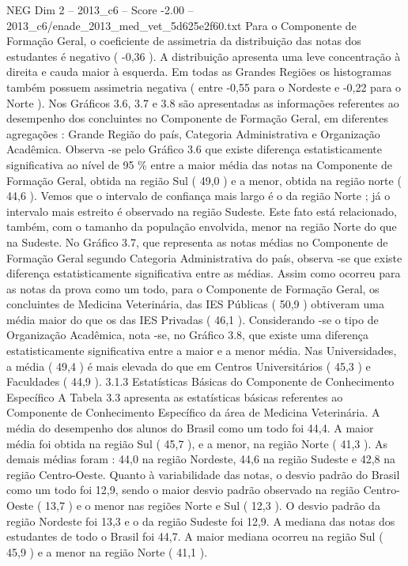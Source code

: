 \begin{textsample}{NEG Dim 2 – 2013\_c6 – Score -2.00 – 2013\_c6/enade\_2013\_med\_vet\_5d625e2f60.txt}
Para o Componente de Formação Geral, o coeficiente de assimetria da distribuição das notas dos estudantes é negativo ( -0,36 ).
A distribuição apresenta uma leve concentração à direita e cauda maior à esquerda.
Em todas as Grandes Regiões os histogramas também possuem assimetria negativa ( entre -0,55 para o Nordeste e -0,22 para o Norte ).
Nos Gráficos 3.6, 3.7 e 3.8 são apresentadas as informações referentes ao desempenho dos concluintes no Componente de Formação Geral, em diferentes agregações : Grande Região do país, Categoria Administrativa e Organização Acadêmica.
Observa -se pelo Gráfico 3.6 que existe diferença estatisticamente significativa ao nível de 95 \% entre a maior média das notas na Componente de Formação Geral, obtida na região Sul ( 49,0 ) e a menor, obtida na região norte ( 44,6 ).
Vemos que o intervalo de confiança mais largo é o da região Norte ; já o intervalo mais estreito é observado na região Sudeste.
Este fato está relacionado, também, com o tamanho da população envolvida, menor na região Norte do que na Sudeste.
No Gráfico 3.7, que representa as notas médias no Componente de Formação Geral segundo Categoria Administrativa do país, observa -se que existe diferença estatisticamente significativa entre as médias.
Assim como ocorreu para as notas da prova como um todo, para o Componente de Formação Geral, os concluintes de Medicina Veterinária, das IES Públicas ( 50,9 ) obtiveram uma média maior do que os das IES Privadas ( 46,1 ).
Considerando -se o tipo de Organização Acadêmica, nota -se, no Gráfico 3.8, que existe uma diferença estatisticamente significativa entre a maior e a menor média.
Nas Universidades, a média ( 49,4 ) é mais elevada do que em Centros Universitários ( 45,3 ) e Faculdades ( 44,9 ). 3.1.3 Estatísticas Básicas do Componente de Conhecimento Específico A Tabela 3.3 apresenta as estatísticas básicas referentes ao Componente de Conhecimento Específico da área de Medicina Veterinária.
A média do desempenho dos alunos do Brasil como um todo foi 44,4.
A maior média foi obtida na região Sul ( 45,7 ), e a menor, na região Norte ( 41,3 ).
As demais médias foram : 44,0 na região Nordeste, 44,6 na região Sudeste e 42,8 na região Centro-Oeste.
Quanto à variabilidade das notas, o desvio padrão do Brasil como um todo foi 12,9, sendo o maior desvio padrão observado na região Centro-Oeste ( 13,7 ) e o menor nas regiões Norte e Sul ( 12,3 ).
O desvio padrão da região Nordeste foi 13,3 e o da região Sudeste foi 12,9.
A mediana das notas dos estudantes de todo o Brasil foi 44,7.
A maior mediana ocorreu na região Sul ( 45,9 ) e a menor na região Norte ( 41,1 ).

\end{textsample}
